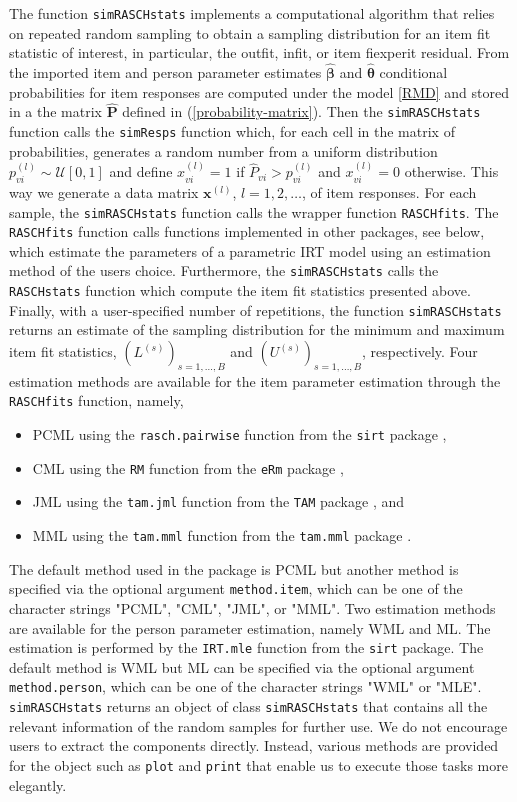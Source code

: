 \documentclass[11pt,a4paper]{article}
\begin{document}
The function \texttt{simRASCHstats} implements a computational algorithm that relies on repeated random sampling to obtain a sampling distribution for an item fit statistic of interest, in particular, the outfit, infit, or item fiexperit residual. From the imported item and person parameter estimates $\hat{\boldsymbol\beta}$ and $\hat{\boldsymbol\theta}$ conditional probabilities for item responses are computed under the model \eqref{RMD} and stored in a the matrix $\boldsymbol{\hat{P}}$ defined in (\eqref{probability-matrix}). Then the \texttt{simRASCHstats} function calls the \texttt{simResps} function which, for each cell in the matrix of probabilities, generates a random number from a uniform distribution $p^{(l)}_{vi} \sim \mathcal{U}[0,1]$ and define $x^{(l)}_{vi}=1$ if $\hat{P}_{vi} > p^{(l)}_{vi}$ and $x^{(l)}_{vi}=0$ otherwise. This way we generate a data matrix  $\mathbf{x}^{(l)}$, $l=1,2,\ldots$, of item responses.
For each sample, the \texttt{simRASCHstats} function calls the wrapper function \texttt{RASCHfits}. The \texttt{RASCHfits} function calls functions implemented in other packages, see below, which estimate the parameters of a parametric IRT model using an estimation method of the users choice. Furthermore, the \texttt{simRASCHstats} calls the \texttt{RASCHstats} function which compute the item fit statistics presented above. Finally, with a user-specified number of repetitions, the function \texttt{simRASCHstats} returns an estimate of the sampling distribution for the minimum and maximum item fit statistics, $(L^{(s)})_{s=1,\ldots,B}$ and $(U^{(s)})_{s=1,\ldots,B}$, respectively. Four estimation  methods are available for the item parameter estimation through the \texttt{RASCHfits} function, namely,
\begin{itemize}
    \item PCML using the \texttt{rasch.pairwise} function from the \texttt{sirt} package \cite{sirt},
    \item CML using the \texttt{RM}  function from the \texttt{eRm} package \cite{erm},
    \item JML using the \texttt{tam.jml} function from the \texttt{TAM} package \cite{tam}, and 
    \item MML using the \texttt{tam.mml} function from the \texttt{tam.mml} package \cite{tam}.
\end{itemize} 
The default method used in the package is PCML but another method is specified via the optional argument \texttt{method.item}, which can be one of the character strings "PCML", "CML", "JML", or "MML". Two estimation methods are available for the person parameter estimation, namely WML and ML. The estimation is performed by the \texttt{IRT.mle} function from the \texttt{sirt} package. The default method is WML but ML can be specified via the optional argument \texttt{method.person}, which can be one of the character strings "WML" or "MLE".
\texttt{simRASCHstats} returns an object of class \texttt{simRASCHstats} that contains all the relevant information of the random samples for further use. We do not encourage users to extract the components directly. Instead, various methods are provided for the object such as \texttt{plot} and \texttt{print} that enable us to execute those tasks more elegantly.
\end{document}
